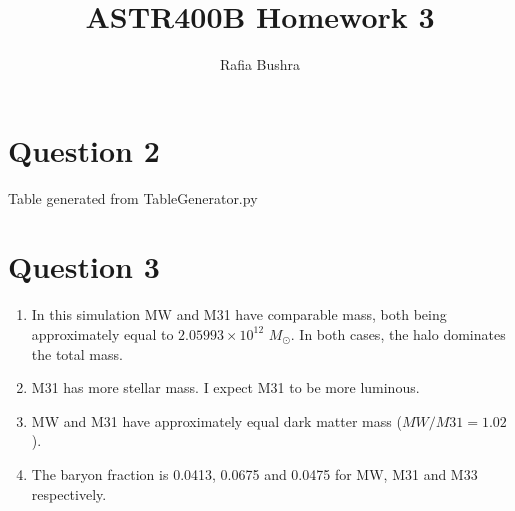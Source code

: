 \documentclass{article}
\title{ASTR400B Homework 3}
\author{Rafia Bushra}
\begin{document}
\maketitle


\section{Question 2}
    Table generated from TableGenerator.py
    

\section{Question 3}
    \begin{enumerate}
        \item In this simulation MW and M31 have comparable mass, both being approximately equal to $2.05993 \times 10^{12}$ \(M_\odot\). In both cases, the halo dominates the total mass.
        \item M31 has more stellar mass. I expect M31 to be more luminous.
        \item MW and M31 have approximately equal dark matter mass ($MW/M31 = 1.02$).
        \item The baryon fraction is 0.0413, 0.0675 and 0.0475 for MW, M31 and M33 respectively. 
    \end{enumerate}
\end{document}
